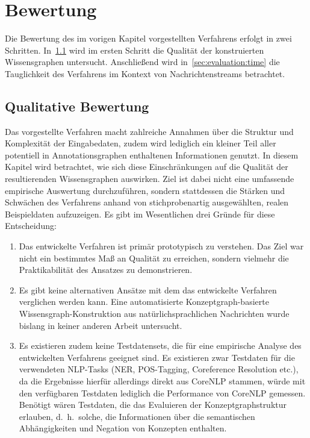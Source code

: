 \chapter{Bewertung}%
\label{sec:evaluation}

Die Bewertung des im vorigen Kapitel vorgestellten Verfahrens erfolgt in zwei Schritten.
In~\ref{sec:evaluation:quality} wird im ersten Schritt die Qualität der konstruierten Wissensgraphen untersucht.
Anschließend wird in~\ref{sec:evaluation:time} die Tauglichkeit des Verfahrens im Kontext von Nachrichtenstreams betrachtet.

\section{Qualitative Bewertung}%
\label{sec:evaluation:quality}

Das vorgestellte Verfahren macht zahlreiche Annahmen über die Struktur und Komplexität der Eingabedaten, zudem wird lediglich ein kleiner Teil aller potentiell in Annotationsgraphen enthaltenen Informationen genutzt.
In diesem Kapitel wird betrachtet, wie sich diese Einschränkungen auf die Qualität der resultierenden Wissensgraphen auswirken.
Ziel ist dabei nicht eine umfassende empirische Auswertung durchzuführen, sondern stattdessen die Stärken und Schwächen des Verfahrens anhand von stichprobenartig ausgewählten, realen Beispieldaten aufzuzeigen.
Es gibt im Wesentlichen drei Gründe für diese Entscheidung:
\begin{enumerate}
	\item Das entwickelte Verfahren ist primär prototypisch zu verstehen.
		Das Ziel war nicht ein bestimmtes Maß an Qualität zu erreichen, sondern vielmehr die Praktikabilität des Ansatzes zu demonstrieren.
	\item Es gibt keine alternativen Ansätze mit dem das entwickelte Verfahren verglichen werden kann.
		Eine automatisierte Konzeptgraph-basierte Wissensgraph-Konstruktion aus natürlichsprachlichen Nachrichten wurde bislang in keiner anderen Arbeit untersucht.
	\item Es existieren zudem keine Testdatensets, die für eine empirische Analyse des entwickelten Verfahrens geeignet sind.
		Es existieren zwar Testdaten für die verwendeten NLP-Tasks (NER, POS-Tagging, Coreference Resolution etc.), da die Ergebnisse hierfür allerdings direkt aus CoreNLP stammen, würde mit den verfügbaren Testdaten lediglich die Performance von CoreNLP gemessen.
		Benötigt wären Testdaten, die das Evaluieren der Konzept\-graph\-struktur erlauben, d.~h.\ solche, die Informationen über die semantischen Abhängigkeiten und Negation von Konzepten enthalten.
\end{enumerate}

